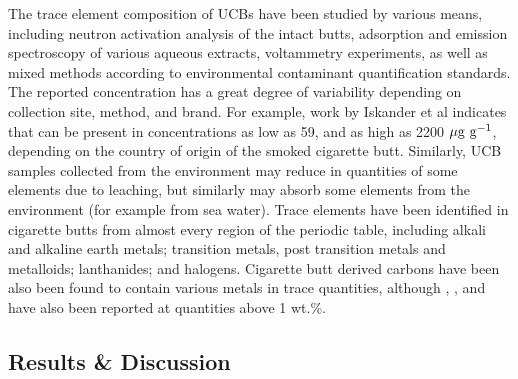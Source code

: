 The trace element composition of UCBs have been studied by various means, including neutron activation analysis of the intact butts,\citep{iskander1992multielement, Iskander1985, jenkins1985neutron, Wu1997} adsorption and emission spectroscopy of various aqueous extracts,\citep{MussaloRauhamaa1986, Kazi2009, Moriwaki2009, Moerman2011, Pelit2013, Dobaradaran2018} voltammetry experiments,\citep{Nitsch1991, Kalcher1993} as well as mixed methods according to environmental contaminant quantification standards.\citep{cardoso2018exposure} The reported concentration has a great degree of variability depending on collection site, method, and brand. For example, work by Iskander et al indicates that  can be present in concentrations as low as 59, and as high as 2200 $\rm{\mu g\ g^{-1}}$, depending on the country of origin of the smoked cigarette butt. Similarly, UCB samples collected from the environment\citep{Dobaradaran2017, Moriwaki2009, Moerman2011, chevalier2018nano} may reduce in quantities of some elements due to leaching, but similarly may absorb some elements from the environment (for example from sea water). Trace elements have been identified in cigarette butts from almost every region of the periodic table, including alkali and alkaline earth metals;\cite{MussaloRauhamaa1986, Iskander1985, iskander1992multielement, jenkins1985neutron, Wu1997, cardoso2018exposure}  transition metals, post transition metals and metalloids;\citep{MussaloRauhamaa1986, Dobaradaran2017, Iskander1985, jenkins1985neutron, Wu1997, Moriwaki2009, Moerman2011, Pelit2013, Dobaradaran2018, Ren2017, cardoso2018exposure, chevalier2018nano} lanthanides;\citep{iskander1992multielement} and halogens.\citep{Iskander1985, iskander1992multielement, jenkins1985neutron, Wu1997} Cigarette butt derived carbons have been also been found to contain various metals in trace quantities,\citep{Soltani, Soltani2013, Yazdi2012} although , , and  have also been reported at quantities above 1 wt.\%.\citep{Soltani, Soltani2013, Yazdi2012, Lima2018}

\subsection{Results \& Discussion}
\label{s:cigarette_butts}

